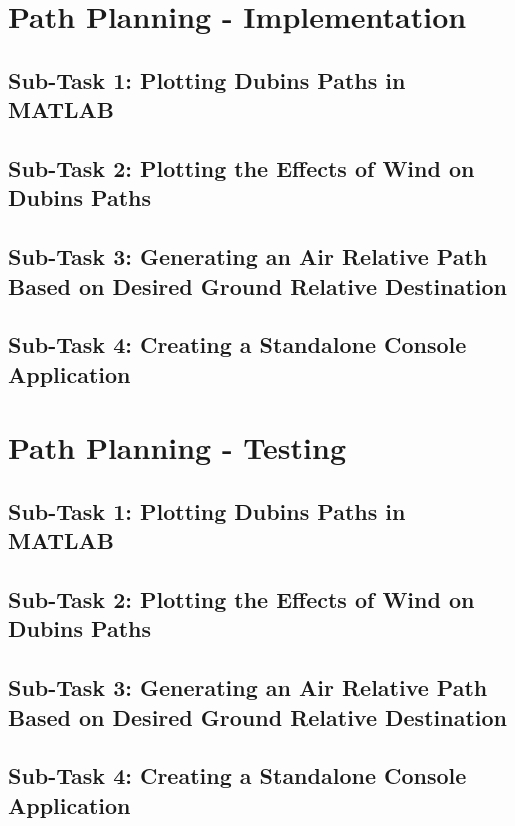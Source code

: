 \section{Path Planning - Implementation}
\label{task1:implementation}

\subsection{Sub-Task 1: Plotting Dubins Paths in MATLAB}
\label{task1:implementation:subtask1}



\subsection{Sub-Task 2: Plotting the Effects of Wind on Dubins Paths}
\label{task1:implementation:subtask2}


\subsection{Sub-Task 3: Generating an Air Relative Path Based on Desired Ground Relative Destination}
\label{task1:implementation:subtask3}


\subsection{Sub-Task 4: Creating a Standalone Console Application}
\label{task1:implementation:subtask4}

\section{Path Planning - Testing}
\label{task1:testing}

\subsection{Sub-Task 1: Plotting Dubins Paths in MATLAB}
\label{task1:testing:subtask1}


\subsection{Sub-Task 2: Plotting the Effects of Wind on Dubins Paths}
\label{task1:testing:subtask2}


\subsection{Sub-Task 3: Generating an Air Relative Path Based on Desired Ground Relative Destination}
\label{task1:testing:subtask3}


\subsection{Sub-Task 4: Creating a Standalone Console Application}
\label{task1:testing:subtask4}
